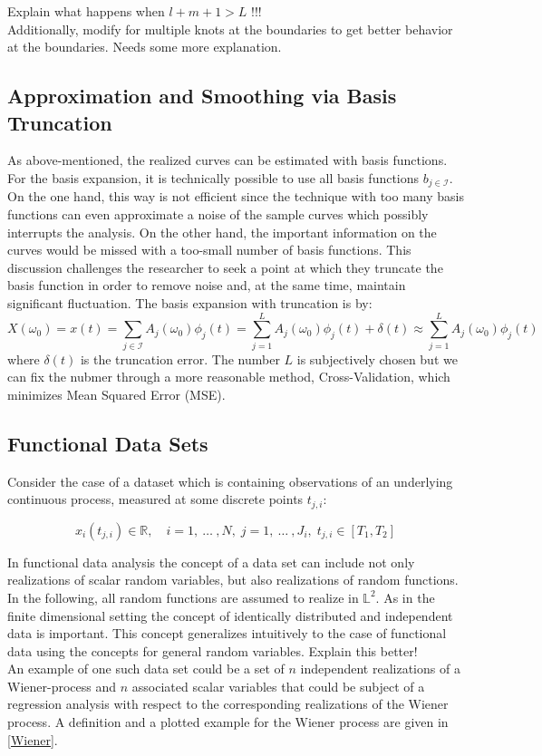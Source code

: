 \documentclass[11pt,twoside,a4paper]{article}
\begin{document}
	{\color{red}Explain what happens when $l+m+1 > L$ !!!\\
		Additionally, modify for multiple knots at the boundaries to get better behavior at the boundaries. Needs some more explanation.}	
	
	\subsection{Approximation and Smoothing via Basis Truncation}
	As above-mentioned, the realized curves can be estimated with basis functions. For the basis expansion, it is technically possible to use all basis functions $b_{j \in \mathcal{I}}$. On the one hand, this way is not efficient since the technique with too many basis functions can even approximate a noise of the sample curves which possibly interrupts the analysis. On the other hand, the important information on the curves would be missed with a too-small number of basis functions. This discussion challenges the researcher to seek a point at which they truncate the basis function in order to remove noise and, at the same time, maintain significant fluctuation. The basis expansion with truncation is by:
	\begin{equation}
		X(\omega_0) = x(t) = \sum_{j \in \mathcal{I}} A_j(\omega_0) \phi_j(t) = \sum_{j = 1}^{L} A_j(\omega_0) \phi_j(t) + \delta(t) \approx \sum_{j = 1}^{L} A_j(\omega_0) \phi_j(t)
	\end{equation}
	where $\delta(t)$ is the truncation error. The number $L$ is subjectively chosen but we can fix the nubmer through a more reasonable method, Cross-Validation, which minimizes Mean Squared Error (MSE). 
	
	\subsection{Functional Data Sets}
	
	Consider the case of a dataset which is containing observations of an underlying continuous process, measured at some discrete points $t_{j,i}$: 
	
	\begin{equation}
		x_{i}(t_{j,i}) \in \mathbb{R}, \quad i = 1,\: \dots\: ,N, \; j = 1, \: \dots \:, J_i, \; t_{j,i} \in [T_1, T_2]
	\end{equation}
	
	In functional data analysis the concept of a data set can include not only realizations of scalar random variables, but also realizations of random functions. In the following, all random functions are assumed to realize in $\mathbb{L}^2$. As in the finite dimensional setting the concept of identically distributed and independent data is important. This concept generalizes intuitively to the case of functional data using the concepts for general random variables. {\color{red} Explain this better!}\\
	An example of one such data set could be a set of $n$ independent realizations of a Wiener-process and $n$ associated scalar variables that could be subject of a regression analysis with respect to the corresponding realizations of the Wiener process. A definition and a plotted example for the Wiener process are given in \ref{Wiener}.
	
\end{document}

